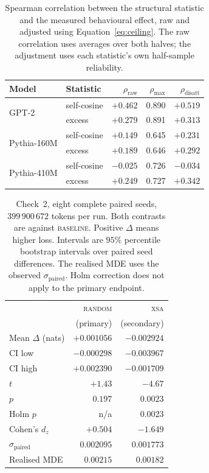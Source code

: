 \documentclass{article} %
\begin{document}
\begin{table}[tb]
\centering
\small
\begin{tabular}{@{}llrrr@{}}
\toprule
Model & Statistic & $\rho_{\text{raw}}$ & $\rho_{\max}$ & $\rho_{\text{disatt}}$ \\
\midrule
\multirow{2}{*}{GPT-2}
  & self-cosine & $+0.462$ & 0.890 & $+0.519$ \\
  & excess      & $+0.279$ & 0.891 & $+0.313$ \\
\multirow{2}{*}{Pythia-160M}
  & self-cosine & $+0.149$ & 0.645 & $+0.231$ \\
  & excess      & $+0.189$ & 0.646 & $+0.292$ \\
\multirow{2}{*}{Pythia-410M}
  & self-cosine & $-0.025$ & 0.726 & $-0.034$ \\
  & excess      & $+0.249$ & 0.727 & $+0.342$ \\
\bottomrule
\end{tabular}
\caption{Spearman correlation between the structural statistic and the measured
behavioural effect, raw and adjusted using Equation~\ref{eq:ceiling}.
The raw correlation uses averages over both halves; the adjustment uses
each statistic's own half-sample reliability.}
\label{tab:a2}
\end{table}

\begin{table}[tb]
\centering
\small
\begin{tabular}{@{}lrr@{}}
\toprule
 & \textsc{random} & \textsc{xsa} \\
 & (primary) & (secondary) \\
\midrule
Mean $\Delta$ (nats)     & $+0.001056$ & $-0.002924$ \\
CI low                   & $-0.000298$ & $-0.003967$ \\
CI high                  & $+0.002390$ & $-0.001709$ \\
$t$                      & $+1.43$     & $-4.67$ \\
$p$                      & $0.197$     & $0.0023$ \\
Holm $p$                 & n/a         & $0.0023$ \\
Cohen's $d_z$            & $+0.504$    & $-1.649$ \\
$\sigma_{\text{paired}}$ & $0.002095$  & $0.001773$ \\
Realised MDE             & $0.00215$   & $0.00182$ \\
\bottomrule
\end{tabular}
\caption{Check~2, eight complete paired seeds, $399\,900\,672$ tokens per run.
Both contrasts are against \textsc{baseline}. Positive $\Delta$ means higher
loss. Intervals are $95\%$ percentile bootstrap intervals over paired seed
differences. The realised MDE uses the observed $\sigma_{\text{paired}}$.
Holm correction does not apply to the primary endpoint.}
\label{tab:paired}
\end{table}
\end{document}
